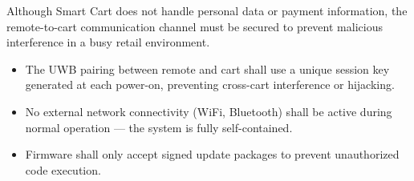 Although Smart Cart does not handle personal data or payment information,
the remote-to-cart communication channel must be secured to prevent
malicious interference in a busy retail environment.
\begin{itemize}
  \item The UWB pairing between remote and cart shall use a unique session key generated at each power-on, preventing cross-cart interference or hijacking.
  \item No external network connectivity (WiFi, Bluetooth) shall be active during normal operation --- the system is fully self-contained.
  \item Firmware shall only accept signed update packages to prevent unauthorized code execution.
\end{itemize}
